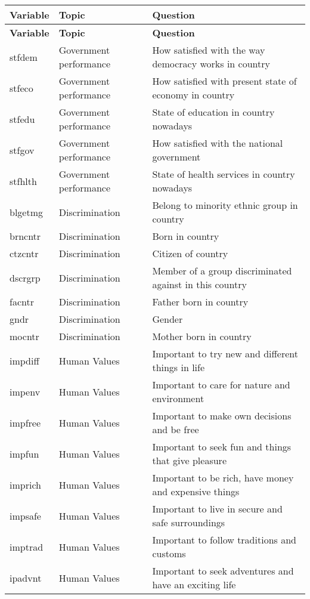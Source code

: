 \begin{longtable}{p{1.2cm}p{3.2cm}p{6cm}}
	\textbf{Variable} & \textbf{Topic} & \textbf{Question} \\
	\hline
	\endfirsthead
	\textbf{Variable} & \textbf{Topic} & \textbf{Question} \\
	\hline
	\endhead
	
	stfdem & Government performance & How satisfied with the way democracy works in country \\
	stfeco & Government performance & How satisfied with present state of economy in country \\
	stfedu & Government performance & State of education in country nowadays \\
	stfgov & Government performance & How satisfied with the national government \\
	stfhlth & Government performance & State of health services in country nowadays \\
	blgetmg & Discrimination & Belong to minority ethnic group in country \\
	brncntr & Discrimination & Born in country \\
	ctzcntr & Discrimination & Citizen of country \\
	dscrgrp & Discrimination & Member of a group discriminated against in this country \\
	facntr & Discrimination & Father born in country \\
	gndr & Discrimination & Gender \\
	mocntr & Discrimination & Mother born in country \\
	impdiff & Human Values & Important to try new and different things in life \\
	impenv & Human Values & Important to care for nature and environment \\
	impfree & Human Values & Important to make own decisions and be free \\
	impfun & Human Values & Important to seek fun and things that give pleasure \\
	imprich & Human Values & Important to be rich, have money and expensive things \\
	impsafe & Human Values & Important to live in secure and safe surroundings \\
	imptrad & Human Values & Important to follow traditions and customs \\
	ipadvnt & Human Values & Important to seek adventures and have an exciting life \\

\end{longtable}

